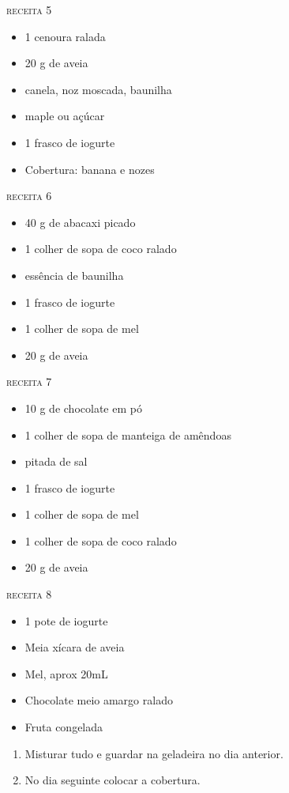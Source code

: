 {	\textsc{receita 5}
	\begin{itemize}
		\item 1 cenoura ralada
		\item 20 g de aveia
		\item canela, noz moscada, baunilha
		\item maple ou açúcar
		\item 1 frasco de iogurte
		\item Cobertura: banana e nozes
	\end{itemize}

	\textsc{receita 6}
	\begin{itemize}
		\item 40 g de abacaxi picado
		\item 1 colher de sopa de coco ralado
		\item essência de baunilha
		\item 1 frasco de iogurte
		\item 1 colher de sopa de mel
		\item 20 g de aveia
	\end{itemize}
}{

	\textsc{receita 7}
	\begin{itemize}
		\item 10 g de chocolate em pó
		\item 1 colher de sopa de manteiga de amêndoas
		\item pitada de sal
		\item 1 frasco de iogurte
		\item 1 colher de sopa de mel
		\item 1 colher de sopa de coco ralado
		\item 20 g de aveia
	\end{itemize}

	\textsc{receita 8}
	\begin{itemize}
		\item 1 pote de iogurte
		\item Meia xícara de aveia
		\item Mel, aprox 20mL
		\item Chocolate meio amargo ralado
		\item Fruta congelada
	\end{itemize}

} {
	\begin{enumerate}
		\item Misturar tudo e guardar na geladeira no dia anterior.
		\item No dia seguinte colocar a cobertura.
	\end{enumerate} }


